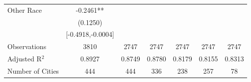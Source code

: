 \documentclass{article}
\begin{document}
\begin{table}[htbp]
\begin{tabular}{l*{6}{c}}
Other Race          &     -0.2461** &               &               &               &               &               \\
                    &    (0.1250)   &               &               &               &               &               \\
                    &[-0.4918,-0.0004]   &               &               &               &               &               \\
\midrule
Observations        &        3810   &        2747   &        2747   &        2747   &        2747   &        2747   \\
Adjusted R$^2$      &      0.8927   &      0.8749   &      0.8780   &      0.8179   &      0.8155   &      0.8313   \\
Number of Cities    &         444   &         444   &         336   &         238   &         257   &          78   \\
\bottomrule
\end{tabular}
\end{table}
\end{document}
